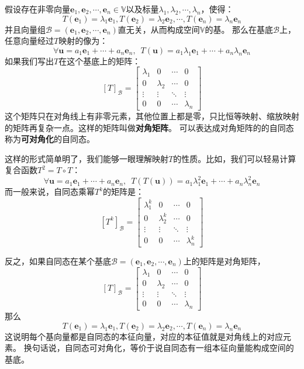 \documentclass[12pt,UTF8]{ctexbook}
\begin{document}
假设存在非零向量$\mathbf{e}_1, \mathbf{e}_2, \cdots, \mathbf{e}_n \in \mathbb{V}$以及标量$\lambda_1, \lambda_2, \cdots, \lambda_n$，使得：
$$ T(\mathbf{e}_1) = \lambda_1 \mathbf{e}_1, T(\mathbf{e}_2) = \lambda_2 \mathbf{e}_2, \cdots , T(\mathbf{e}_n) = \lambda_n \mathbf{e}_n$$
并且向量组$\mathcal{B} = (\mathbf{e}_1, \mathbf{e}_2, \cdots, \mathbf{e}_n)$直无关，从而构成空间$\mathbb{V}$的基。
那么在基底$\mathcal{B}$上，任意向量经过$T$映射的像为：
$$ \forall \mathbf{u} = a_1 \mathbf{e}_1 + \cdots + a_n \mathbf{e}_n, \,\,\, T(\mathbf{u}) = a_1 \lambda_1 \mathbf{e}_1 + \cdots + a_n \lambda_n \mathbf{e}_n$$
如果我们写出$T$在这个基底上的矩阵：
$$ [T]_{\mathcal{B}} = \begin{bmatrix} \lambda_1 & 0 & \cdots & 0 \\ 0 & \lambda_2 & \cdots & 0 \\ \vdots & \vdots & \ddots & \vdots \\ 0 & 0 & \cdots & \lambda_n \end{bmatrix}$$
这个矩阵只在对角线上有非零元素，其他位置上都是零，只比恒等映射、缩放映射的矩阵再复杂一点。这样的矩阵叫做\textbf{对角矩阵}。
可以表达成对角矩阵的的自同态称为\textbf{可对角化}的自同态。

这样的形式简单明了，我们能够一眼理解映射$T$的性质。比如，我们可以轻易计算复合函数$T^2 = T\circ T$：
$$  \forall \mathbf{u} = a_1 \mathbf{e}_1 + \cdots + a_n \mathbf{e}_n, \,\,\, T(T(\mathbf{u})) = a_1 \lambda_1^2 \mathbf{e}_1 + \cdots + a_n \lambda_n^2 \mathbf{e}_n$$
而一般来说，自同态乘幂$T^k$的矩阵是：
$$ [T^k]_{\mathcal{B}} = \begin{bmatrix} \lambda_1^k & 0 & \cdots & 0 \\ 0 & \lambda_2^k & \cdots & 0 \\ \vdots & \vdots & \ddots & \vdots \\ 0 & 0 & \cdots & \lambda_n^k \end{bmatrix}$$

反之，如果自同态在某个基底$\mathcal{B} = (\mathbf{e}_1, \mathbf{e}_2, \cdots, \mathbf{e}_n)$上的矩阵是对角矩阵，
$$ [T]_{\mathcal{B}} = \begin{bmatrix} \lambda_1 & 0 & \cdots & 0 \\ 0 & \lambda_2 & \cdots & 0 \\ \vdots & \vdots & \ddots & \vdots \\ 0 & 0 & \cdots & \lambda_n \end{bmatrix}$$
那么
$$ T(\mathbf{e}_1) = \lambda_1 \mathbf{e}_1, T(\mathbf{e}_2) = \lambda_2 \mathbf{e}_2, \cdots , T(\mathbf{e}_n) = \lambda_n \mathbf{e}_n$$
这说明每个基向量都是自同态的本征向量，对应的本征值就是对角线上的对应元素。
换句话说，自同态可对角化，等价于说自同态有一组本征向量能构成空间的基底。
\end{document}
